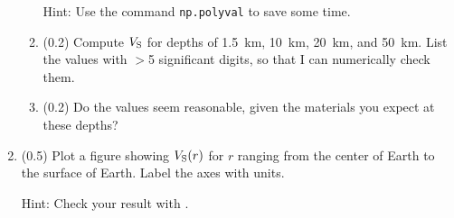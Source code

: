 \documentclass[11pt,titlepage,fleqn]{article}
\begin{document}
\begin{enumerate}
\begin{enumerate}
Hint: Use the command \verb+np.polyval+ to save some time.

\item (0.2) Compute $V_{\rm S}$ for depths of 1.5~km, 10~km, 20~km, and 50~km.
%
List the values with $>$5 significant digits, so that I can numerically check them.

\item (0.2) Do the values seem reasonable, given the materials you expect at these depths?
\end{enumerate}


\item (0.5) Plot a figure showing $V_{\rm S}(r)$ for $r$ ranging from the center of Earth to the surface of Earth. Label the axes with units.

Hint: Check your result with \citet[][Figure~1.1]{ShearerE2}.



\end{enumerate}
\end{document}
